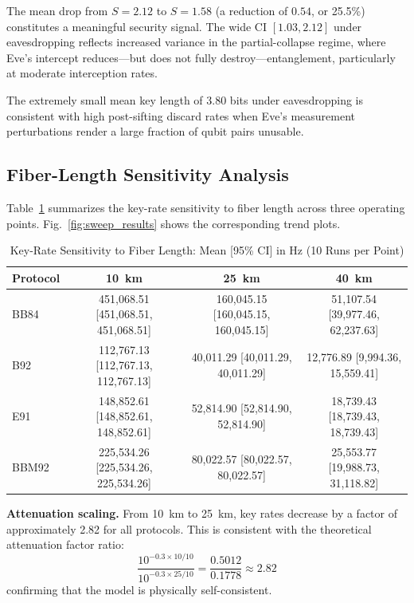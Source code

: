 \documentclass[journal]{IEEEtran}
\begin{document}
The mean drop from $S=2.12$ to $S=1.58$ (a reduction of $0.54$, or
25.5\%) constitutes a meaningful security signal. The wide CI
$[1.03, 2.12]$ under eavesdropping reflects increased variance in
the partial-collapse regime, where Eve's intercept reduces—but does
not fully destroy—entanglement, particularly at moderate interception
rates.

The extremely small mean key length of 3.80 bits under eavesdropping
is consistent with high post-sifting discard rates when Eve's measurement
perturbations render a large fraction of qubit pairs unusable.

\subsection{Fiber-Length Sensitivity Analysis}

Table~\ref{tab:sweep_stats} summarizes the key-rate sensitivity to
fiber length across three operating points. Fig.~\ref{fig:sweep_results}
shows the corresponding trend plots.

\begin{table}[!t]
  \caption{Key-Rate Sensitivity to Fiber Length: Mean [95\% CI] in Hz
           (10 Runs per Point)}
  \label{tab:sweep_stats}
  \centering
  \footnotesize
  \begin{tabular}{lccc}
    \toprule
    Protocol & 10~km & 25~km & 40~km \\
    \midrule
    BB84  & 451,068.51 [451,068.51, 451,068.51]
          & 160,045.15 [160,045.15, 160,045.15]
          & 51,107.54  [39,977.46, 62,237.63] \\
    B92   & 112,767.13 [112,767.13, 112,767.13]
          & 40,011.29  [40,011.29, 40,011.29]
          & 12,776.89  [9,994.36, 15,559.41] \\
    E91   & 148,852.61 [148,852.61, 148,852.61]
          & 52,814.90  [52,814.90, 52,814.90]
          & 18,739.43  [18,739.43, 18,739.43] \\
    BBM92 & 225,534.26 [225,534.26, 225,534.26]
          & 80,022.57  [80,022.57, 80,022.57]
          & 25,553.77  [19,988.73, 31,118.82] \\
    \bottomrule
  \end{tabular}
\end{table}

\textbf{Attenuation scaling.}
From 10~km to 25~km, key rates decrease by a factor of approximately
2.82 for all protocols. This is consistent with the theoretical
attenuation factor ratio:
\begin{equation}
  \frac{10^{-0.3 \times 10/10}}{10^{-0.3 \times 25/10}}
  = \frac{0.5012}{0.1778} \approx 2.82
  \label{eq:ratio}
\end{equation}
confirming that the model is physically self-consistent.
\end{document}

